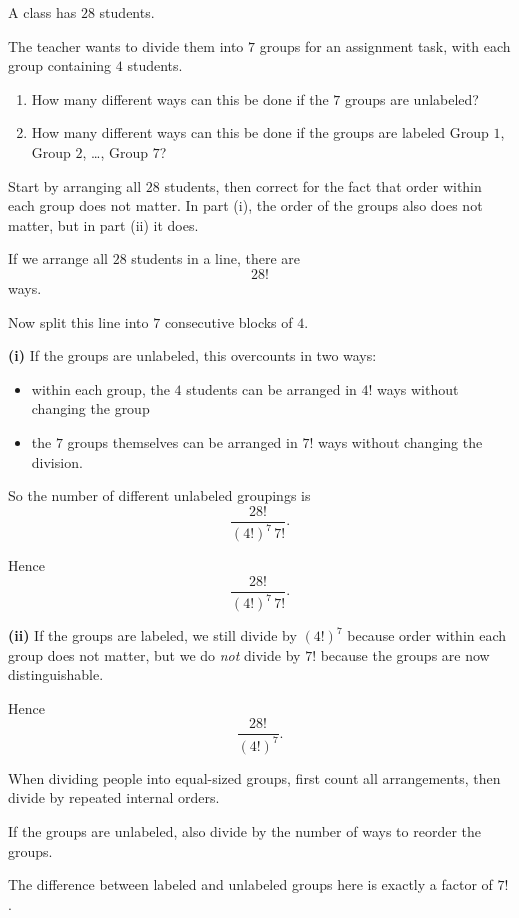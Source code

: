 \begin{problem}
A class has $28$ students.

The teacher wants to divide them into $7$ groups for an assignment task, with each group containing $4$ students.

\begin{enumerate}
  \item[(i)] How many different ways can this be done if the $7$ groups are unlabeled?
  \item[(ii)] How many different ways can this be done if the groups are labeled Group $1$, Group $2$, \dots, Group $7$?
\end{enumerate}
\end{problem}

\begin{hint}
Start by arranging all $28$ students, then correct for the fact that order within each group does not matter. In part (i), the order of the groups also does not matter, but in part (ii) it does.
\end{hint}

\begin{solution}
If we arrange all $28$ students in a line, there are
\[
28!
\]
ways.

Now split this line into $7$ consecutive blocks of $4$.

\textbf{(i)} If the groups are unlabeled, this overcounts in two ways:
\begin{itemize}[leftmargin=*]
  \item within each group, the $4$ students can be arranged in $4!$ ways without changing the group
  \item the $7$ groups themselves can be arranged in $7!$ ways without changing the division.
\end{itemize}

So the number of different unlabeled groupings is
\[
\frac{28!}{(4!)^7\,7!}.
\]

Hence
\[
\boxed{\frac{28!}{(4!)^7\,7!}}.
\]

\textbf{(ii)} If the groups are labeled, we still divide by $(4!)^7$ because order within each group does not matter, but we do \emph{not} divide by $7!$ because the groups are now distinguishable.

Hence
\[
\boxed{\frac{28!}{(4!)^7}}.
\]
\end{solution}

\begin{takeaways}
\item When dividing people into equal-sized groups, first count all arrangements, then divide by repeated internal orders.
\item If the groups are unlabeled, also divide by the number of ways to reorder the groups.
\item The difference between labeled and unlabeled groups here is exactly a factor of $7!$.
\end{takeaways}

